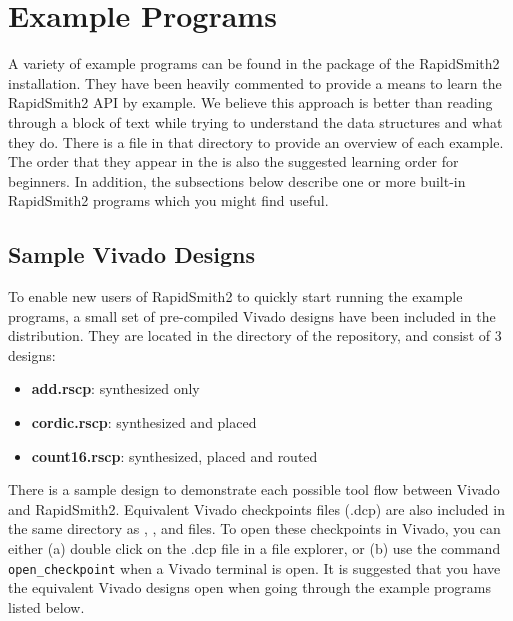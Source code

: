 \newpage
\section{Example Programs} \label{examples}

A variety of example programs can be found in the
 package of the RapidSmith2 installation.
They have been heavily commented to provide a means to learn the RapidSmith2 API by
example. We believe this approach is better than reading through a block of
text while trying to understand the data structures and what they do.
There is a  file in that directory to provide an overview of
each example. The order that they appear in the  is also the
suggested learning order for beginners. In addition, the subsections below
describe one or more built-in RapidSmith2 programs which you might find useful.

\subsection{Sample Vivado Designs}
To enable new users of RapidSmith2 to quickly start running the example
programs, a small set of pre-compiled Vivado designs have been included in the
distribution. They are located in the  directory of
the repository, and consist of 3 designs: 
\begin{itemize}
\item \textbf{add.rscp}: synthesized only
\item \textbf{cordic.rscp}: synthesized and placed
\item \textbf{count16.rscp}: synthesized, placed and routed
\end{itemize} 
There is a sample design to demonstrate each possible tool flow between Vivado
and RapidSmith2. Equivalent Vivado checkpoints files (.dcp) are also included in
the same directory as , , and 
files. To open these checkpoints in Vivado, you can either (a) double click on
the .dcp file in a file explorer, or (b) use the command
\texttt{open\_checkpoint} when a Vivado terminal is open. It is suggested that
you have the equivalent Vivado designs open when going through the example
programs listed below.

